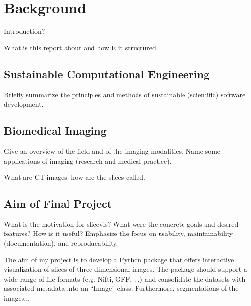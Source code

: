 \chapter{Background}

Introduction?

What is this report about and how is it structured.

\section{Sustainable Computational Engineering}

Briefly summarize the principles and methods of sustainable (scientific) software development.

\section{Biomedical Imaging}

Give an overview of the field and of the imaging modalities. Name some applications of imaging (research and medical practice).

What are CT images, how are the slices called.

\section{Aim of Final Project}

What is the motivation for slicevis?
What were the concrete goals and desired features?
How is it useful?
Emphasize the focus on usability, maintainability (documentation), and reproducability.

The aim of my project is to develop a Python package that offers interactive visualization of slices of three-dimensional images. The package should support a wide range of file formats (e.g. Nifti, GFF, ...) and consolidate the datasets with associated metadata into an \enquote{Image} class. Furthermore, segmentations of the images...